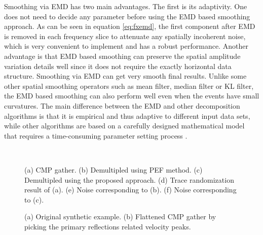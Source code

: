 Smoothing via EMD has two main advantages. The first is its adaptivity. One does not need to decide any parameter before using the EMD based smoothing approach. As can be seen in equation \ref{eq:fxemd}, the first component after EMD is removed in each frequency slice to attenuate any spatially incoherent noise, which is very convenient to implement and has a robust performance. Another advantage is that EMD based smoothing can preserve the spatial amplitude variation details well since it does not require the exactly horizontal data structure. Smoothing via EMD can get very smooth final results. Unlike some other spatial smoothing operators such as mean filter, median filter or KL filter, the EMD based smoothing can also perform well even when the events have small curvatures. The main difference between the EMD and other decomposition algorithms is that it is empirical and thus adaptive to different input data sets, while other algorithms are based on a carefully designed mathematical model that requires a time-consuming parameter setting process \cite{liuwei2016,liuwei2016vmd,huijian2016}.


 \begin{figure}[ht!]
  \centering
  \\
   \caption{(a) CMP gather. (b) Demultipled using PEF method. (c) Demultipled using the proposed approach. (d) Trace randomization result of (a). (e) Noise corresponding to (b). (f) Noise corresponding to (c).}
   \label{fig:ncmp,back,nrand-emd-back,rand,dif,emd-dif}
\end{figure}

\begin{figure}[htb!]
  \centering
   \caption{(a) Original synthetic example. (b) Flattened CMP gather by picking the primary reflections related velocity peaks. }
   \label{fig:hask,nmo}
\end{figure}

